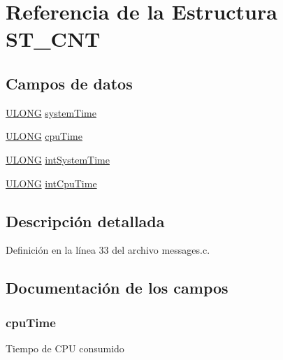 \hypertarget{struct_s_t___c_n_t}{}\section{Referencia de la Estructura S\+T\+\_\+\+C\+N\+T}
\label{struct_s_t___c_n_t}
\subsection*{Campos de datos}
\begin{DoxyCompactItemize}
\item 
\hyperlink{sdp_types_8h_af632da489ebc3708ec3ab6791ee53fa4}{U\+L\+O\+N\+G} \hyperlink{struct_s_t___c_n_t_a9ff17a87e2d5c2c20efd3883fc5e8afd}{system\+Time}
\item 
\hyperlink{sdp_types_8h_af632da489ebc3708ec3ab6791ee53fa4}{U\+L\+O\+N\+G} \hyperlink{struct_s_t___c_n_t_ae4c31cb2b4477be7ae2f947073b3d770}{cpu\+Time}
\item 
\hyperlink{sdp_types_8h_af632da489ebc3708ec3ab6791ee53fa4}{U\+L\+O\+N\+G} \hyperlink{struct_s_t___c_n_t_a8c0fad2befd4574e6a7fae46124d5339}{int\+System\+Time}
\item 
\hyperlink{sdp_types_8h_af632da489ebc3708ec3ab6791ee53fa4}{U\+L\+O\+N\+G} \hyperlink{struct_s_t___c_n_t_a61dff6fa53638f76ef2f5c004a58992b}{int\+Cpu\+Time}
\end{DoxyCompactItemize}


\subsection{Descripción detallada}


Definición en la línea 33 del archivo messages.\+c.



\subsection{Documentación de los campos}
\hypertarget{struct_s_t___c_n_t_ae4c31cb2b4477be7ae2f947073b3d770}{}
\subsubsection[{cpu\+Time}]{ cpu\+Time}\label{struct_s_t___c_n_t_ae4c31cb2b4477be7ae2f947073b3d770}
Tiempo de C\+P\+U consumido 

